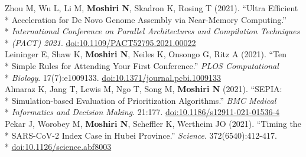 \documentclass[margin,line]{res}
\begin{document}
\begin{resume}
\hspace*{4mm} Zhou M, Wu L, Li M, \textbf{Moshiri N}, Skadron K, Rosing T (2021). ``Ultra Efficient\\*
\hspace*{9.5mm} Acceleration for De Novo Genome Assembly via Near-Memory Computing.''\\*
\hspace*{9.5mm} \textit{International Conference on Parallel Architectures and Compilation Techniques}\\*\vspace{2mm}
\hspace*{8mm} \textit{(PACT) 2021}. \href{https://doi.org/10.1109/PACT52795.2021.00022}{doi:10.1109/PACT52795.2021.00022}\\
\hspace*{4mm} Leininger E, Shaw K, \textbf{Moshiri N}, Neiles K, Onsongo G, Ritz A (2021). ``Ten\\*
\hspace*{9.5mm} Simple Rules for Attending Your First Conference.'' \textit{PLOS Computational}\\*\vspace{2mm}
\hspace*{8mm} \textit{Biology}. 17(7):e1009133. \href{https://doi.org/10.1371/journal.pcbi.1009133}{doi:10.1371/journal.pcbi.1009133}\\
\hspace*{4mm} Almaraz K, Jang T, Lewis M, Ngo T, Song M, \textbf{Moshiri N} (2021). ``SEPIA:\\*
\hspace*{9.5mm} Simulation-based Evaluation of Prioritization Algorithms.'' \textit{BMC Medical}\\*\vspace{2mm}
\hspace*{8mm} \textit{Informatics and Decision Making}. 21:177. \href{https://doi.org/10.1186/s12911-021-01536-4}{doi:10.1186/s12911-021-01536-4}\\
\hspace*{4mm} Pekar J, Worobey M, \textbf{Moshiri N}, Scheffler K, Wertheim JO (2021). ``Timing the\\*
\hspace*{9.5mm} SARS-CoV-2 Index Case in Hubei Province.'' \textit{Science}. 372(6540):412-417.\\*\vspace{2mm}
\hspace*{8mm} \href{https://doi.org/10.1126/science.abf8003}{doi:10.1126/science.abf8003}\\

\end{resume}
\end{document}
